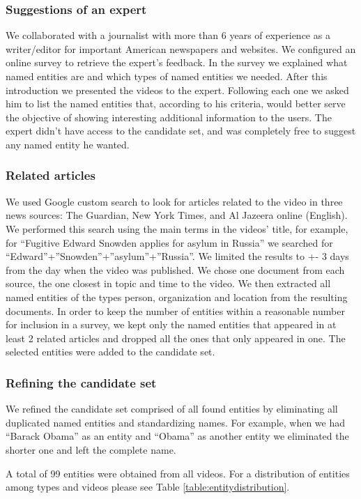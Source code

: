 \documentclass{llncs}
\begin{document}
\subsubsection{Suggestions of an expert}
We collaborated with a journalist with more than 6 years of experience as a writer/editor for important American newspapers and websites.  We configured an online survey to retrieve the expert’s feedback. In the survey we explained what named entities are and which types of named entities we needed. After this introduction we presented the videos to the expert. Following each one we asked him to list the named entities that, according to his criteria, would better serve the objective of showing interesting additional information to the users. The expert didn’t have access to the candidate set, and was completely free to suggest any named entity he wanted. 

\subsubsection{Related articles}
We used Google custom search to look for articles related to the video in three news sources: The Guardian, New York Times, and Al Jazeera online (English). We performed this search using the main terms in the videos’ title, for example, for “Fugitive Edward Snowden applies for asylum in Russia” we searched for  “Edward”+”Snowden”+”asylum”+”Russia”. We limited the results to +- 3 days from the day when the video was published. We chose one document from each source, the one closest in topic and time to the video. We then extracted all named entities of the types person, organization and location from the resulting documents. In order to keep the number of entities within a reasonable number for inclusion in a survey, we kept only the named entities that appeared in at least 2 related articles and dropped all the ones that only appeared in one.  The selected entities were added to the candidate set. 

\subsubsection{Refining the candidate set}
We refined the candidate set  comprised of all found entities by eliminating all duplicated named entities and standardizing names. For example, when we had “Barack Obama” as an entity and “Obama” as another entity we eliminated the shorter one and left the complete name. 
	
A total of 99 entities were obtained from all videos. For a distribution of entities among types and videos please see Table \ref{table:entitydistribution}.
\end{document}
